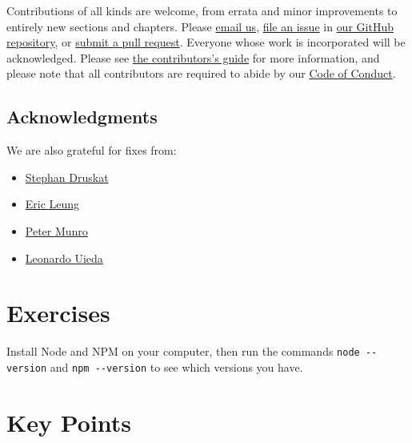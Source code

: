 Contributions of all kinds are welcome,
from errata and minor improvements to entirely new sections and chapters.
Please \href{mailto:gvwilson@third-bit.com}{email us},
\href{https://github.com/software-tools-in-javascript/js4ds/issues}{file an issue} in \href{https://github.com/software-tools-in-javascript/js4ds/}{our GitHub repository},
or \href{https://github.com/software-tools-in-javascript/js4ds/pulls}{submit a pull request}.
Everyone whose work is incorporated will be acknowledged.
Please see \href{/en/contributing/}{the contributors's guide} for more information,
and please note that all contributors are required to abide by
our \href{/en/conduct/}{Code of Conduct}.

\subsection{Acknowledgments}\label{s:intro-acknowledgments}

We are also grateful for fixes from:

\begin{itemize}
\item
  \href{https://github.com/sdruskat}{Stephan Druskat}
\item
  \href{https://erictleung.com/}{Eric Leung}
\item
  \href{https://github.com/pdm55}{Peter Munro}
\item
  \href{http://www.leouieda.com/}{Leonardo Uieda}
\end{itemize}

\section{Exercises}\label{s:intro-exercises}


Install Node and NPM on your computer,
then run the commands \texttt{node\ -\/-version} and \texttt{npm\ -\/-version}
to see which versions you have.

\section*{Key Points}


